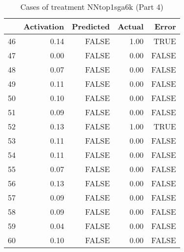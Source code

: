 \begin{table}[ht]
\centering
\begin{tabular}{rrrrr}
  \hline
 & Activation & Predicted & Actual & Error \\ 
  \hline
46 & 0.14 & FALSE & 1.00 & TRUE \\ 
  47 & 0.00 & FALSE & 0.00 & FALSE \\ 
  48 & 0.07 & FALSE & 0.00 & FALSE \\ 
  49 & 0.11 & FALSE & 0.00 & FALSE \\ 
  50 & 0.10 & FALSE & 0.00 & FALSE \\ 
  51 & 0.09 & FALSE & 0.00 & FALSE \\ 
  52 & 0.13 & FALSE & 1.00 & TRUE \\ 
  53 & 0.11 & FALSE & 0.00 & FALSE \\ 
  54 & 0.11 & FALSE & 0.00 & FALSE \\ 
  55 & 0.07 & FALSE & 0.00 & FALSE \\ 
  56 & 0.13 & FALSE & 0.00 & FALSE \\ 
  57 & 0.09 & FALSE & 0.00 & FALSE \\ 
  58 & 0.09 & FALSE & 0.00 & FALSE \\ 
  59 & 0.04 & FALSE & 0.00 & FALSE \\ 
  60 & 0.10 & FALSE & 0.00 & FALSE \\ 
   \hline
\end{tabular}
\caption{Cases of treatment NNtop1sga6k (Part 4)} 
\end{table}
